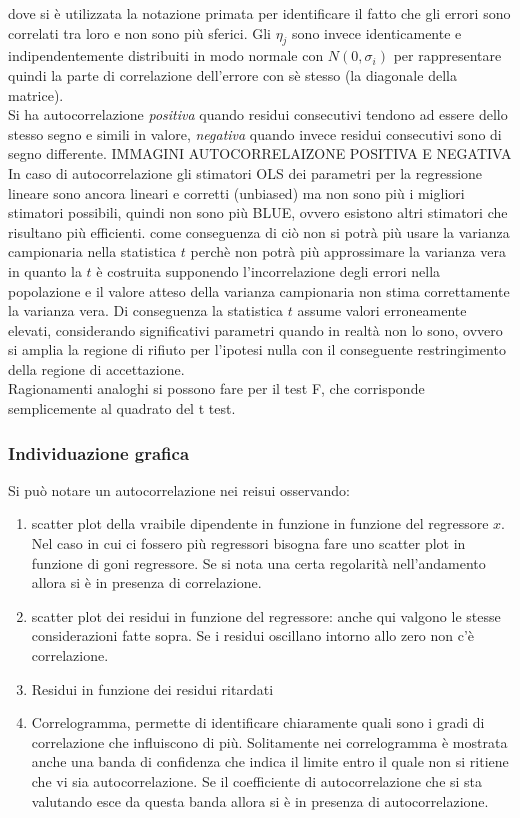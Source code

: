 dove si è utilizzata la notazione primata per identificare il fatto che gli errori sono correlati tra loro e non sono più sferici. Gli $\eta_j$ sono invece identicamente e indipendentemente distribuiti in modo normale con $N(0,\sigma_i)$ per rappresentare quindi la parte di correlazione dell'errore con sè stesso (la diagonale della matrice).\\
Si ha autocorrelazione \textit{positiva} quando residui consecutivi tendono ad essere dello stesso segno e simili in valore, \textit{negativa} quando invece residui consecutivi sono di segno differente.
IMMAGINI AUTOCORRELAIZONE POSITIVA E NEGATIVA
In caso di autocorrelazione gli stimatori OLS  dei parametri per la regressione lineare sono ancora lineari e corretti (unbiased) ma non sono più i migliori stimatori possibili, quindi non sono più BLUE, ovvero esistono altri stimatori che risultano più efficienti. come conseguenza di ciò non si potrà più usare la varianza campionaria nella statistica $t$ perchè non potrà più approssimare la varianza vera in quanto la $t$ è costruita supponendo l'incorrelazione degli errori nella popolazione e il valore atteso della varianza campionaria non stima correttamente la varianza vera. Di conseguenza la statistica $t$ assume valori erroneamente elevati, considerando significativi parametri quando in realtà non lo sono, ovvero si amplia la regione di rifiuto per l'ipotesi nulla con il conseguente restringimento della regione di accettazione. \\
Ragionamenti analoghi si possono fare per il test F, che corrisponde semplicemente al quadrato del t test.
\subsubsection{Individuazione grafica}
Si può notare un autocorrelazione nei reisui osservando:
\begin{enumerate}
	\item scatter plot della vraibile dipendente in funzione in funzione del regressore $x$. Nel caso in cui ci fossero più regressori bisogna fare uno scatter plot in funzione di goni regressore. Se si nota una certa regolarità nell'andamento allora si è in presenza di correlazione.
	\item scatter plot dei residui in funzione del regressore: anche qui valgono le stesse considerazioni fatte sopra. Se i residui oscillano intorno allo zero non c'è correlazione.
	\item Residui in funzione dei residui ritardati
	\item Correlogramma, permette di identificare chiaramente quali sono i gradi di correlazione che influiscono di più. Solitamente nei correlogramma è mostrata anche una banda di confidenza che indica il limite entro il quale non si ritiene che vi sia autocorrelazione. Se il coefficiente di autocorrelazione che si sta valutando esce da questa banda allora si è in presenza di autocorrelazione.
\end{enumerate}
